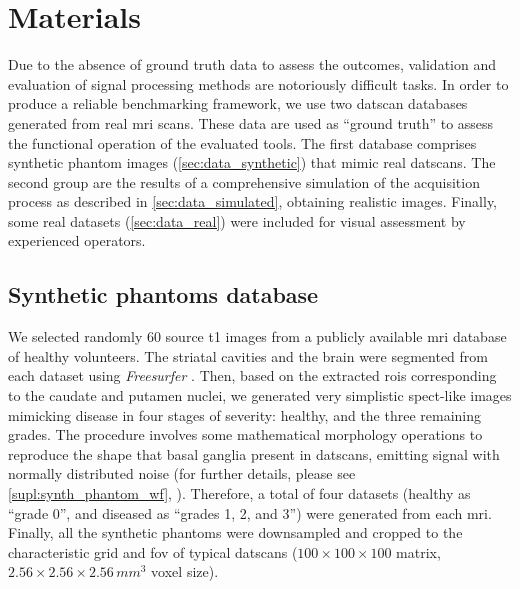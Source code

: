 \documentclass{frontiers}
\newcommand{\cbstart}{\relax}
\newcommand{\cbend}{\relax}
\newcommand{\gridsize}[1]{\ensuremath{#1\times#1\times#1}}
\newcommand{\isores}[2]{\ensuremath{\gridsize{#1}\,#2^{3}}}
\begin{document}
\section{Materials}\label{sec:data}

Due to the absence of ground truth data to assess the outcomes, validation and evaluation 
  of signal processing methods are notoriously difficult tasks.
\cbstart
In order to produce a reliable benchmarking framework, we use two 
  \gls*{datscan} databases generated from real \gls*{mri} scans.
These data are used as ``ground truth'' to assess the functional operation
  of the evaluated tools.
The first database comprises synthetic phantom images (\autoref{sec:data_synthetic})
  that mimic real \glspl*{datscan}.
The second group are the results of a comprehensive simulation of the acquisition 
  process as described in \autoref{sec:data_simulated}, obtaining realistic images.
Finally, some real datasets (\autoref{sec:data_real}) were included for visual 
  assessment by experienced operators.
\cbend

\subsection{Synthetic phantoms database} %
\label{sec:data_synthetic}
We selected randomly 60 source \gls*{t1} images from a publicly available
  \gls*{mri} database \citep{hill_ixi_2006} of healthy volunteers.
The striatal cavities and the brain were segmented from each dataset
  using \emph{Freesurfer} \citep{fischl_freesurfer_2012}.
Then, based on the extracted \glspl*{roi} corresponding to the caudate and putamen
  nuclei, we generated very simplistic \gls*{spect}-like images mimicking disease in
  four stages of severity: healthy, and the three remaining grades.
\cbstart
The procedure involves some mathematical morphology operations to reproduce the
  shape that basal ganglia present in \glspl*{datscan}, emitting signal with
  normally distributed noise (for further details, please see 
  \autoref{supl:synth_phantom_wf}, ).
\cbend
Therefore, a total of four datasets (healthy as ``grade 0'',
  and diseased as ``grades 1, 2, and 3'') were generated from each \gls*{mri}.
Finally, all the synthetic phantoms were downsampled and cropped to the characteristic
  grid and \acrlong*{fov} of typical \glspl*{datscan} (\gridsize{100} matrix,
  \isores{2.56}{mm} voxel size).
\end{document}
